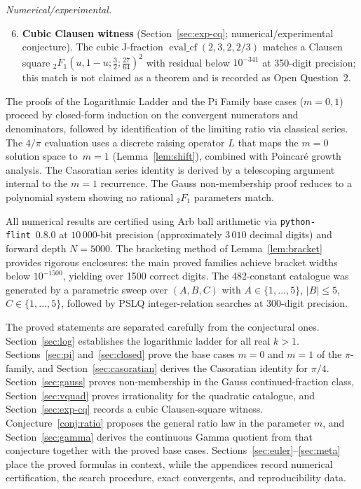 \documentclass[11pt,a4paper]{article}
\theoremstyle{plain}
\theoremstyle{definition}
\theoremstyle{remark}
\begin{document}
\noindent\textit{Numerical/experimental.}
\begin{enumerate}
\setcounter{enumi}{5}
\item \textbf{Cubic Clausen witness}
  (Section~\ref{sec:exp-cq}; numerical/experimental conjecture).
  The cubic J-fraction $\operatorname{eval\_cf}(2,3,2,2/3)$ matches a
  Clausen square ${}_2F_1(u,1{-}u;\frac{3}{2};\frac{27}{64})^2$
  with residual below $10^{-341}$ at 350-digit precision;
  this match is not claimed as a theorem and is recorded as
  Open Question~2.
\end{enumerate}


The proofs of the Logarithmic Ladder and the Pi Family base cases
($m = 0,1$) proceed by closed-form induction on the convergent
numerators and denominators, followed by identification of the
limiting ratio via classical series.
The $4/\pi$ evaluation uses a discrete raising operator $L$ that maps
the $m = 0$ solution space to~$m = 1$ (Lemma~\ref{lem:shift}),
combined with Poincar\'e growth analysis.
The Casoratian series identity is derived by a telescoping argument
internal to the $m = 1$ recurrence.
The Gauss non-membership proof reduces to a polynomial system showing
no rational ${}_2F_1$ parameters match.


All numerical results are certified using Arb ball arithmetic via
\texttt{python-flint}~0.8.0 at $10\,000$-bit precision (approximately
$3\,010$ decimal digits) and forward depth $N = 5000$.
The bracketing method of Lemma~\ref{lem:bracket} provides rigorous
enclosures: the main proved families achieve bracket widths below
$10^{-1500}$, yielding over 1500 correct digits.
The 482-constant catalogue was generated by a parametric sweep over
$(A,B,C)$ with $A \in \{1,\ldots,5\}$, $|B| \le 5$, $C \in \{1,\ldots,5\}$,
followed by PSLQ integer-relation searches at 300-digit precision.

The proved statements are separated carefully from the conjectural ones.
Section~\ref{sec:log} establishes the logarithmic ladder for all real $k>1$.
Sections~\ref{sec:pi} and~\ref{sec:closed} prove the base cases $m=0$ and
$m=1$ of the $\pi$-family, and Section~\ref{sec:casoratian} derives the
Casoratian identity for $\pi/4$. Section~\ref{sec:gauss} proves non-membership
in the Gauss continued-fraction class, Section~\ref{sec:vquad} proves
irrationality for the quadratic catalogue, and Section~\ref{sec:exp-cq}
records a cubic Clausen-square witness.
Conjecture~\ref{conj:ratio} proposes the general ratio law in the parameter
$m$, and Section~\ref{sec:gamma} derives the continuous Gamma quotient from
that conjecture together with the proved base cases.
Sections~\ref{sec:euler}--\ref{sec:meta}
place the proved formulas in context, while the appendices record numerical
certification, the search procedure, exact convergents, and reproducibility data.
\end{document}
